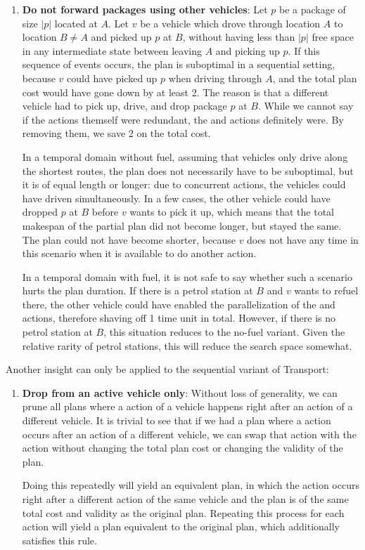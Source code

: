 \begin{enumerate}
\item \textbf{Do not forward packages using other vehicles}:
Let $p$ be a package of size $|p|$ located at $A$.
Let $v$ be a vehicle which drove through location $A$ to location $B \neq A$
and picked up $p$ at $B$,
without having less than $|p|$ free space in any intermediate state between leaving $A$ and picking up $p$.
If this sequence of events occurs, the plan is suboptimal in a sequential setting, because
$v$ could have picked up $p$ when driving through $A$, and the total plan cost
would have gone down by at least 2. The reason is that a different vehicle had to pick up, drive, and drop package $p$ at $B$.
While we cannot say if the \drive{} actions themself
were redundant, the \pickup{} and \drop{} actions definitely were.
By removing them, we save 
2 on the total cost. 

In a temporal domain without fuel, assuming that vehicles only drive along the shortest routes,
the plan does not necessarily have to be suboptimal, but it
is of equal length or longer: due to concurrent actions, the vehicles could have driven simultaneously.
In a few cases, the other vehicle could have dropped $p$ at $B$ before $v$ wants to pick it up,
which means that the total makespan of the partial plan did not become longer, but stayed the same.
The plan could not have become shorter, because $v$ does not have any time in this scenario when it is available to do another action.

In a temporal domain with fuel, it is not safe to say whether
such a scenario hurts the plan duration. If there is a petrol station at $B$
and $v$ wants to refuel there, the other vehicle could have enabled the parallelization 
of the  and \pickup{} actions, therefore shaving off 1 time unit in total.
However, if there is no petrol
station at $B$, this situation reduces to the no-fuel variant. Given the relative rarity of petrol stations, this will reduce the search space somewhat.
\end{enumerate}
Another insight can only be applied to the sequential variant of Transport:
\begin{enumerate}
\item \textbf{Drop from an active vehicle only}: Without loss of generality,
we can prune all plans where a \drop{} action of a vehicle happens
right after an action of a different vehicle. It is trivial to see that if we had a plan where
a \drop{} action
occurs after an action of a different vehicle, we can swap that action with the \drop{} action without changing the total plan cost or changing the validity of the plan.

Doing this repeatedly will yield an equivalent plan, in which the \drop{} action
occurs right after a different action of the same vehicle and the plan is of the same total cost and validity as the original plan. Repeating this process for each \drop{} action will yield a plan equivalent to the original plan, which additionally satisfies this rule.
\end{enumerate}
